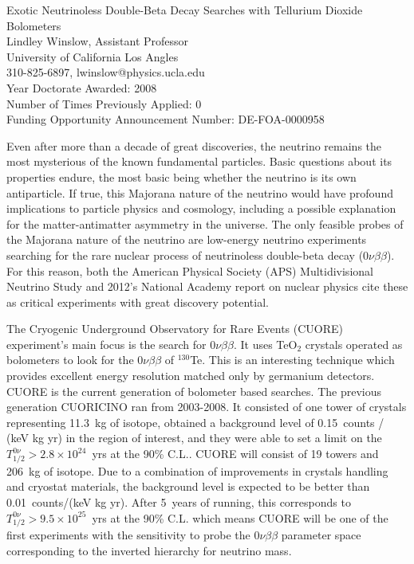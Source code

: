 \documentclass[11pt]{article}
\begin{document}
 
\begin{center}
Exotic Neutrinoless Double-Beta Decay Searches with Tellurium Dioxide Bolometers \\
Lindley Winslow, Assistant Professor\\
University of California Los Angles\\
310-825-6897, lwinslow@physics.ucla.edu\\
Year Doctorate Awarded: 2008\\
Number of Times Previously Applied: 0\\
Funding Opportunity Announcement Number: DE-FOA-0000958\\
\end{center}

Even after more than a decade of great discoveries, the neutrino remains the most mysterious of the known fundamental particles. Basic questions about its properties endure, the most basic being whether the neutrino is its own antiparticle. If true, this Majorana nature of the neutrino would have profound implications to particle physics and cosmology, including a possible explanation for the matter-antimatter asymmetry in the universe. The only feasible probes of the Majorana nature of the neutrino are low-energy neutrino experiments searching for the rare nuclear process of neutrinoless double-beta decay ($0\nu\beta\beta$). For this reason, both the American Physical Society (APS) Multidivisional Neutrino Study\cite{numatrix} and 2012's National Academy report on nuclear physics\cite{national2012Nuclear} cite these as critical experiments with great discovery potential.

The Cryogenic Underground Observatory for Rare Events (CUORE) experiment's main focus is the search for $0\nu\beta\beta$.  It uses TeO$_{2}$ crystals operated as bolometers to look for the $0\nu\beta\beta$ of $^{130}$Te. This is an interesting technique which provides excellent energy resolution matched only by germanium detectors. CUORE is the current generation of bolometer based searches. The previous generation CUORICINO ran from 2003-2008. It consisted of one tower of crystals representing 11.3~kg of isotope, obtained a background level of 0.15~counts / (keV kg yr) in the region of interest, and they were able to set a limit on the $T_{1/2}^{0\nu}>2.8\times10^{24}$~yrs at the 90\% C.L.\cite{CC2008}. CUORE will consist of 19 towers and 206~kg of isotope. Due to a combination of improvements in crystals handling and cryostat materials, the background level is expected to be better than 0.01~counts/(keV kg yr).  After 5~years of running, this corresponds to $T_{1/2}^{0\nu}>9.5\times10^{25}$~yrs at the 90\% C.L. which means CUORE will be one of the first experiments with the sensitivity to probe the $0\nu\beta\beta$ parameter space corresponding to the inverted hierarchy for neutrino mass. 
\end{document}
